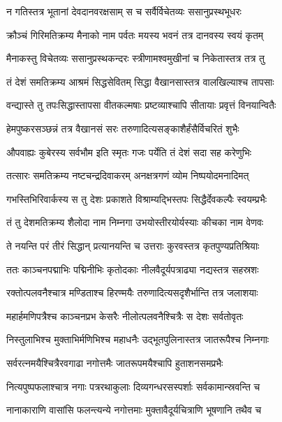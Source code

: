 \twolineshloka
{न गतिस्तत्र भूतानां देवदानवरक्षसाम्}
{स च सर्वैर्विचेतव्यः ससानुप्रस्थभूधरः} %

\twolineshloka
{क्रौञ्चं गिरिमतिक्रम्य मैनाको नाम पर्वतः}
{मयस्य भवनं तत्र दानवस्य स्वयं कृतम्} %

\twolineshloka
{मैनाकस्तु विचेतव्यः ससानुप्रस्थकन्दरः}
{स्त्रीणामश्वमुखीनां च निकेतास्तत्र तत्र तु} %

\twolineshloka
{तं देशं समतिक्रम्य आश्रमं सिद्धसेवितम्}
{सिद्धा वैखानसास्तत्र वालखिल्याश्च तापसाः} %

\twolineshloka
{वन्द्यास्ते तु तपःसिद्धास्तापसा वीतकल्मषाः}
{प्रष्टव्याश्चापि सीतायाः प्रवृत्तं विनयान्वितैः} %

\twolineshloka
{हेमपुष्करसञ्छन्नं तत्र वैखानसं सरः}
{तरुणादित्यसङ्काशैर्हंसैर्विचरितं शुभैः} %

\twolineshloka
{औपवाह्यः कुबेरस्य सर्वभौम इति स्मृतः}
{गजः पर्येति तं देशं सदा सह करेणुभिः} %

\twolineshloka
{तत्सारः समतिक्रम्य नष्टचन्द्रदिवाकरम्}
{अनक्षत्रगणं व्योम निष्पयोदमनादिमत्} %

\twolineshloka
{गभस्तिभिरिवार्कस्य स तु देशः प्रकाशते}
{विश्राम्यद्भिस्तपः सिद्धैर्देवकल्पैः स्वयम्प्रभैः} %

\twolineshloka
{तं तु देशमतिक्रम्य शैलोदा नाम निम्नगा}
{उभयोस्तीरयोर्यस्याः कीचका नाम वेणवः} %

\twolineshloka
{ते नयन्ति परं तीरं सिद्धान् प्रत्यानयन्ति च}
{उत्तराः कुरवस्तत्र कृतपुण्यप्रतिश्रियाः} %

\twolineshloka
{ततः काञ्चनपद्माभिः पद्मिनीभिः कृतोदकाः}
{नीलवैदूर्यपत्राढ्या नद्यस्तत्र सहस्रशः} %

\twolineshloka
{रक्तोत्पलवनैश्चात्र मण्डिताश्च हिरण्मयैः}
{तरुणादित्यसदृशैर्भान्ति तत्र जलाशयाः} %

\twolineshloka
{महार्हमणिपत्रैश्च काञ्चनप्रभ केसरैः}
{नीलोत्पलवनैश्चित्रैः स देशः सर्वतोवृतः} %

\twolineshloka
{निस्तुलाभिश्च मुक्ताभिर्मणिभिश्च महाधनैः}
{उद्भूतपुलिनास्तत्र जातरूपैश्च निम्नगाः} %

\twolineshloka
{सर्वरत्नमयैश्चित्रैरवगाढा नगोत्तमैः}
{जातरूपमयैश्चापि हुताशनसमप्रभैः} %

\twolineshloka
{नित्यपुष्पफलाश्चात्र नगाः पत्ररथाकुलाः}
{दिव्यगन्धरसस्पर्शाः सर्वकामान्स्रवन्ति च} %

\twolineshloka
{नानाकाराणि वासांसि फलन्त्यन्ये नगोत्तमाः}
{मुक्तावैदूर्यचित्राणि भूषणानि तथैव च} %

